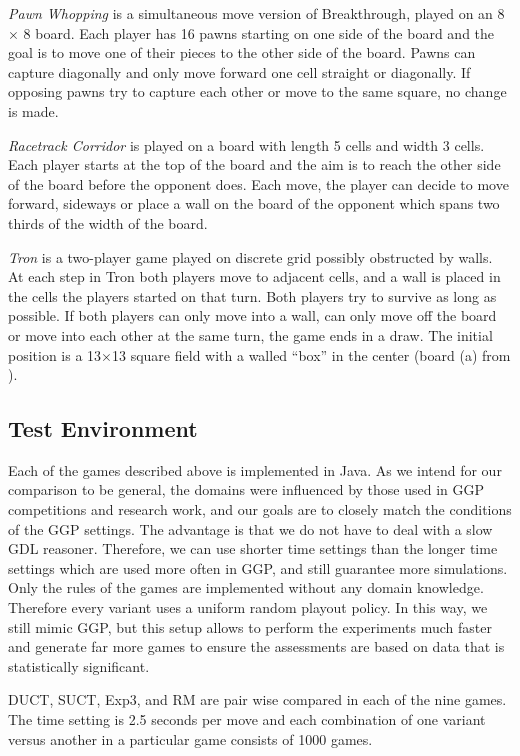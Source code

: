 \documentclass[conference]{IEEEtran}
\begin{document}
\textit{Pawn Whopping} is a simultaneous move version of Breakthrough, played on an 8 $\times$ 8 board. Each player has 
16 pawns starting on one side of the board and the goal is to move one of their pieces to the other side of the board. 
Pawns can capture diagonally and only move forward one cell straight or diagonally.
If opposing pawns try to capture each other or move to the same square, no change is made. 

\textit{Racetrack Corridor} is played on a board with length 5 cells and width 3 cells. Each player starts at the top of the board and the aim is to reach the other side of the board before the opponent does. Each move, the player can decide to move forward, sideways or place a wall on the board of the opponent which spans two thirds of the width of the board.

\textit{Tron} is a two-player game played on discrete grid possibly obstructed by walls. At each
step in Tron both players move to adjacent cells, and a wall is placed in the cells the players started on that turn. 
Both players try to survive as long as possible. If both players can only move into a wall, can only move off the board or move into each other at the same turn, the game ends in a draw. The initial position is a 13$\times$13 square field with a walled ``box'' in the center (board (a) from \cite{Lanctot13Tron}).
 

\subsection{Test Environment}

Each of the games described above is implemented in Java. As we intend for our comparison to be general, the domains were 
influenced by those used in GGP competitions and research work, and our goals are to closely match the conditions of the 
GGP settings. 
The advantage is that we do not have to deal with a slow GDL reasoner. Therefore, we can use shorter time settings than 
the longer time settings which are used more often in GGP, and still guarantee more simulations. Only the rules of the 
games are implemented without any domain knowledge. Therefore every variant uses a uniform random playout policy. 
In this way, we still mimic GGP, but this setup allows to perform 
the experiments much faster and generate far more games to ensure the assessments are based on data that is statistically
significant. 

DUCT, SUCT, Exp3, and RM are pair wise compared in each of the nine games. The time setting is 2.5 seconds per move and 
each combination of one variant versus another in a particular game consists of 1000 games.  
\end{document}
